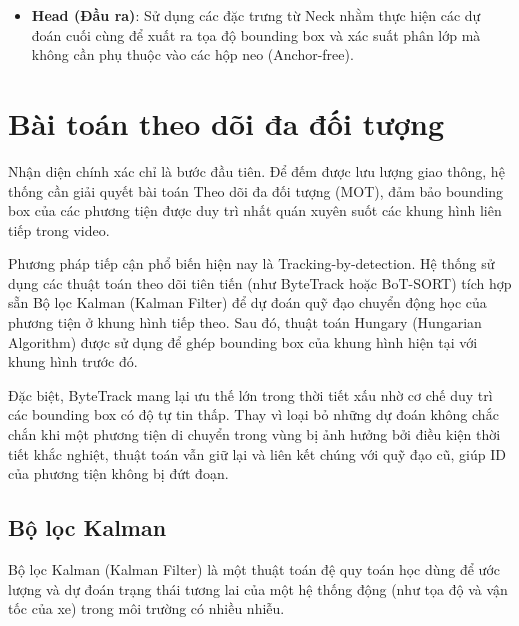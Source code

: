 \begin{itemize}
\begin{itemize}
		\item[$\circ$] \textbf{Khối C2PSA (Cross Stage Partial Spatial Attention)}: là một cải tiến đáng kể giúp tăng cường khả năng chú ý không gian trên các bản đồ đặc trưng. Cơ chế này giúp mô hình tập trung hiệu quả hơn vào các vùng quan trọng trong hình ảnh, giúp cải thiện độ chính xác trong việc phát hiện, đặc biệt đối với các đối tượng nhỏ hoặc bị che khuất một phần. Việc tích hợp C2PSA làm cho YOLO11 khác biệt so với phiên bản tiền nhiệm, YOLOv8, vốn không có cơ chế chú ý cụ thể này.
	\end{itemize}
	
	\item \textbf{Head (Đầu ra)}: Sử dụng các đặc trưng từ Neck nhằm thực hiện các dự đoán cuối cùng để xuất ra tọa độ bounding box và xác suất phân lớp mà không cần phụ thuộc vào các hộp neo (Anchor-free).
\end{itemize}

\section{Bài toán theo dõi đa đối tượng}

Nhận diện chính xác chỉ là bước đầu tiên. Để đếm được lưu lượng giao thông, hệ thống cần giải quyết bài toán Theo dõi đa đối tượng (MOT), đảm bảo bounding box của các phương tiện được duy trì nhất quán xuyên suốt các khung hình liên tiếp trong video.

Phương pháp tiếp cận phổ biến hiện nay là Tracking-by-detection. Hệ thống sử dụng các thuật toán theo dõi tiên tiến (như ByteTrack hoặc BoT-SORT) tích hợp sẵn Bộ lọc Kalman (Kalman Filter) để dự đoán quỹ đạo chuyển động học của phương tiện ở khung hình tiếp theo. Sau đó, thuật toán Hungary (Hungarian Algorithm) được sử dụng để ghép  bounding box của khung hình hiện tại với khung hình trước đó.

Đặc biệt, ByteTrack mang lại ưu thế lớn trong thời tiết xấu nhờ cơ chế duy trì các bounding box có độ tự tin thấp. Thay vì loại bỏ những dự đoán không chắc chắn khi một phương tiện di chuyển trong vùng bị ảnh hưởng bởi điều kiện thời tiết khắc nghiệt, thuật toán vẫn giữ lại và liên kết chúng với quỹ đạo cũ, giúp ID của phương tiện không bị đứt đoạn.

\subsection{Bộ lọc Kalman}

Bộ lọc Kalman (Kalman Filter) \cite{bytetrack} là một thuật toán đệ quy toán học dùng để ước lượng và dự đoán trạng thái tương lai của một hệ thống động (như tọa độ và vận tốc của xe) trong môi trường có nhiều nhiễu.

